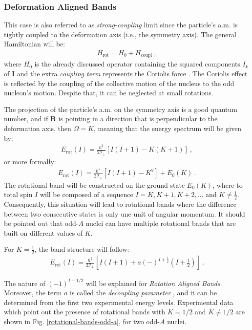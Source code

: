 \subsubsection{Deformation Aligned Bands}

This case is also referred to as \emph{strong-coupling} limit \cite{bohr1953collective} since the particle's a.m. is tightly coupled to the deformation axis (i.e., the symmetry axis). The general Hamiltonian will be:
\begin{align}
    H_\text{rot}=H_0+H_\text{coupl}\ ,
\end{align}
where $H_0$ is the already discussed operator containing the squared components $I_k$ of $\mathbf{I}$ and the extra \emph{coupling term} represents the Coriolis force \cite{bertulani2007nuclear}. The Coriolis effect is reflected by the coupling of the collective motion of the nucleus to the odd nucleon's motion. Despite that, it can be neglected at small rotations.

The projection of the particle's a.m. on the symmetry axis is a good quantum number, and if $\mathbf{R}$ is pointing in a direction that is perpendicular to the deformation axis, then $\Omega=K$, meaning that the energy spectrum will be given by:
\begin{align}
    E_\text{rot}(I)=\frac{\hbar^2}{2\mathcal{I}_\perp}\left[I(I+1)-K(K+1)\right]\ ,
\end{align}
or more formally:
\begin{align}
    E_\text{rot}(I)=\frac{\hbar^2}{2\mathcal{I}_\perp}\left[I(I+1)-K^2\right]+E_0(K)\ .
\end{align}
The rotational band will be constructed on the ground-state $E_0(K)$, where to total spin $I$ will be composed of a sequence $I=K,K+1,K+2,\dots$ and $K\neq\frac{1}{2}$. Consequently, this situation will lead to rotational bands where the difference between two consecutive states is only une unit of angular momentum. It should be pointed out that odd-$A$ nuclei can have multiple rotational bands that are built on different values of $K$.

For $K=\frac{1}{2}$, the band structure will follow:
\begin{align}
    E_\text{rot}(I)=\frac{\hbar^2}{2\mathcal{I}_\perp}\left[I(I+1)+a(-)^{I+\frac{1}{2}}(I+\frac{1}{2})\right]\ .
    \label{deformation-aligned-energy}
\end{align}

The nature of $(-1)^{I+1/2}$ will be explained for \emph{Rotation Aligned Bands}. Moreover, the term $a$ is called the \emph{decoupling parameter} \cite{bertulani2007nuclear}, and it can be determined from the first two experimental energy levels.  Experimental data which point out the presence of rotational bands with $K=1/2$ and $K\neq 1/2$ are shown in Fig. \ref{rotational-bands-odd-a}, for two odd-$A$ nuclei.

